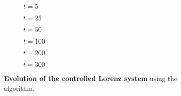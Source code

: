 \begin{figure}
\centering

\begin{subfigure}[t]{.3\textwidth}
	\centering
    	\caption{$t=5$}
	\label{fig:rayleigh_field_0}
\end{subfigure} \quad
\begin{subfigure}[t]{.3\textwidth}
	\centering
    	\caption{$t=25$}
	\label{fig:rayleigh_field_2}
\end{subfigure} \quad
\begin{subfigure}[t]{.3\textwidth}
	\centering
    	\caption{$t=50$}
	\label{fig:rayleigh_field_4}
\end{subfigure}

\medskip

\begin{subfigure}[t]{.3\textwidth}
	\centering
    	\caption{$t=100$}
	\label{fig:rayleigh_field_8}
\end{subfigure} \quad
\begin{subfigure}[t]{.3\textwidth}
	\centering
    	\caption{$t=200$}
	\label{fig:rayleigh_field_10}
\end{subfigure} \quad
\begin{subfigure}[t]{.3\textwidth}
	\centering
    	\caption{$t=300$}
	\label{fig:rayleigh_field_12}
\end{subfigure}

\caption{\textbf{Evolution of the controlled Lorenz system} using the \ppo algorithm.}
\label{fig:lorenz_fields}
\end{figure} 
